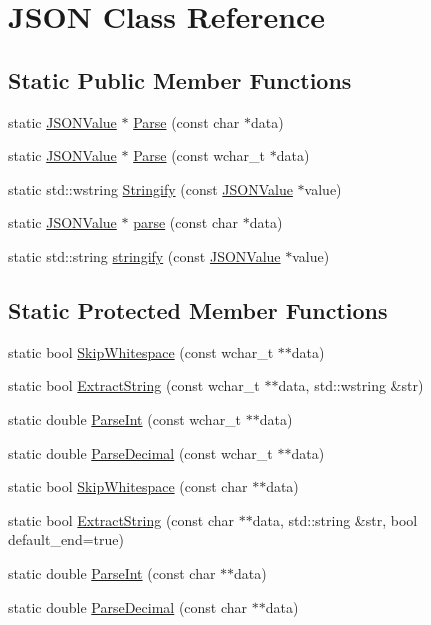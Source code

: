 \hypertarget{classJSON}{\section{\-J\-S\-O\-N \-Class \-Reference}
\label{classJSON}
}
\subsection*{\-Static \-Public \-Member \-Functions}
\begin{DoxyCompactItemize}
\item 
static \hyperlink{classJSONValue}{\-J\-S\-O\-N\-Value} $\ast$ \hyperlink{classJSON_a7f3d733e38c15aaeee7223831f9739a3}{\-Parse} (const char $\ast$data)
\item 
static \hyperlink{classJSONValue}{\-J\-S\-O\-N\-Value} $\ast$ \hyperlink{classJSON_ae0a007d45cbcbfabb54bce9a3c334fa3}{\-Parse} (const wchar\-\_\-t $\ast$data)
\item 
static std\-::wstring \hyperlink{classJSON_afccecef28adea5363fa0fe72ec6043d8}{\-Stringify} (const \hyperlink{classJSONValue}{\-J\-S\-O\-N\-Value} $\ast$value)
\item 
static \hyperlink{classJSONValue}{\-J\-S\-O\-N\-Value} $\ast$ \hyperlink{classJSON_acc96611fd417af5b65b79013948cede1}{parse} (const char $\ast$data)
\item 
static std\-::string \hyperlink{classJSON_ac8440fa6b1fcaf442a9e505dbe1cefd4}{stringify} (const \hyperlink{classJSONValue}{\-J\-S\-O\-N\-Value} $\ast$value)
\end{DoxyCompactItemize}
\subsection*{\-Static \-Protected \-Member \-Functions}
\begin{DoxyCompactItemize}
\item 
static bool \hyperlink{classJSON_af94562ab72cd8d95cb99d8b15475bdce}{\-Skip\-Whitespace} (const wchar\-\_\-t $\ast$$\ast$data)
\item 
static bool \hyperlink{classJSON_a3d814fe0b0033824d17ed231d8c93f41}{\-Extract\-String} (const wchar\-\_\-t $\ast$$\ast$data, std\-::wstring \&str)
\item 
static double \hyperlink{classJSON_a2461184d91fe6286b26d1e056fca6909}{\-Parse\-Int} (const wchar\-\_\-t $\ast$$\ast$data)
\item 
static double \hyperlink{classJSON_af2d51873ecc483a21cf2d9fe16595495}{\-Parse\-Decimal} (const wchar\-\_\-t $\ast$$\ast$data)
\item 
static bool \hyperlink{classJSON_a6101b573a904af0ea2fee028071814e9}{\-Skip\-Whitespace} (const char $\ast$$\ast$data)
\item 
static bool \hyperlink{classJSON_a8c96fc1365d25ae19cb56d5ad7b9748d}{\-Extract\-String} (const char $\ast$$\ast$data, std\-::string \&str, bool default\-\_\-end=true)
\item 
static double \hyperlink{classJSON_a470e922f11065159826bbd59d8b73889}{\-Parse\-Int} (const char $\ast$$\ast$data)
\item 
static double \hyperlink{classJSON_a6d4eb6810c7b29a21a6346dbb8edfd2e}{\-Parse\-Decimal} (const char $\ast$$\ast$data)
\end{DoxyCompactItemize}
